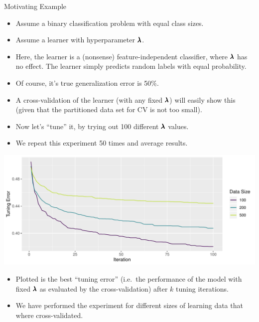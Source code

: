    \begin{frame}[c,allowframebreaks]{Motivating Example}
    \begin{itemize}
        \item Assume a binary classification problem with equal class sizes.
        \item Assume a learner with hyperparameter $\pmb{\lambda}$.
        \item Here, the learner is a (nonsense) feature-independent classifier,
              where $\pmb{\lambda}$ has no effect. The learner simply
              predicts random labels with equal probability.
        \item Of course, it's true generalization error is 50\%.
        \item A cross-validation of the learner (with any fixed $\pmb{\lambda}$) will easily show this
          (given that the partitioned data set for CV is not too small).
        \item Now let's ``tune'' it, by trying out 100 different $\pmb{\lambda}$ values.
        \item We repeat this experiment 50 times and average results.
    \end{itemize}

    \framebreak

    \begin{center}
        \includegraphics[height=.5\textheight]{example-nested-resampling}
    \end{center}

    \begin{itemize}
    \item Plotted is the best ``tuning error'' (i.e.\ the performance of the
        model with fixed $\pmb{\lambda}$ as evaluated by the cross-validation) after $k$ tuning iterations.
    \item We have performed the experiment for different sizes of learning data
          that where cross-validated.
    \end{itemize}


\end{frame}
